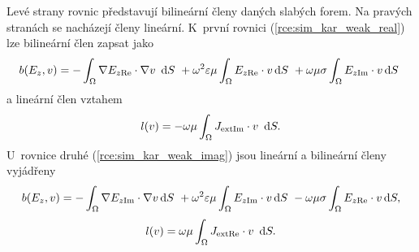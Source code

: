 Levé strany rovnic představují bilineární členy daných slabých forem. Na pravých stranách se nacházejí členy lineární. K~první rovnici (\ref{rce:sim_kar_weak_real}) lze bilineární člen zapsat jako
\begin{equation}
	b(E_{z},v) = -\int_{\Omega}\nabla E_{z\mathrm{Re}}\cdot\nabla v~\,\mathrm{d} S~+ \omega^{2}\varepsilon\mu\int_{\Omega} E_{z\mathrm{Re}}\cdot v\,\mathrm{d} S~+ \omega\mu\sigma\int_{\Omega} E_{z\mathrm{Im}}\cdot v\,\mathrm{d}
S~\label{rce:sim_kar_bilinear_real} 
\end{equation}
a lineární člen vztahem
\begin{equation}
	l(v) = - \omega\mu \int_{\Omega}J_{\mathrm{ext}\mathrm{Im}}\cdot v~\,\mathrm{d} S.
	\label{rce:sim_kar_linear_real}
\end{equation}
U~rovnice druhé (\ref{rce:sim_kar_weak_imag}) jsou lineární a bilineární členy vyjádřeny
\begin{equation}
	b(E_{z},v) = -\int_{\Omega}\nabla E_{z\mathrm{Im}}\cdot\nabla v\,\mathrm{d} S~+ \omega^{2}\varepsilon\mu\int_{\Omega} E_{z\mathrm{Im}}\cdot v\,\mathrm{d} S~- \omega\mu\sigma\int_{\Omega} E_{z\mathrm{Re}}\cdot v\,\mathrm{d} S,
	\label{rce:sim_kar_bilinear_imag}	
\end{equation}
\begin{equation}
	l(v) = \omega\mu \int_{\Omega}J_{\mathrm{ext}\mathrm{Re}}\cdot v~\,\mathrm{d} S.
	\label{rce:sim_kar_linear_imag}
\end{equation}


